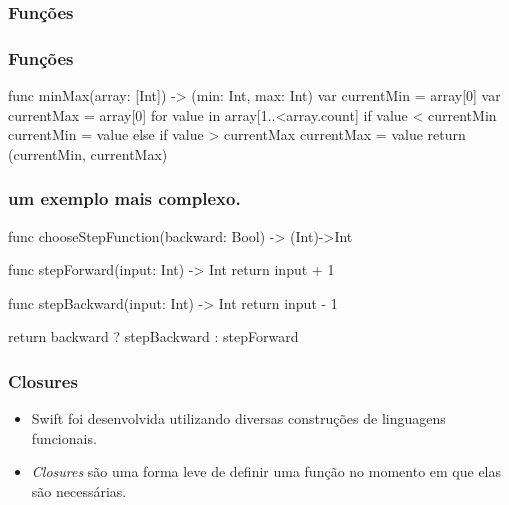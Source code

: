 \begin{frame}[fragile]
    \frametitle{Funções}

\end{frame}

\begin{frame}[fragile]
    \frametitle{Funções}

    \begin{swift}
        func minMax(array: [Int]) -> (min: Int, max: Int) {
            var currentMin = array[0]
            var currentMax = array[0]
            for value in array[1..<array.count] {
                if value < currentMin {
                    currentMin = value
                } else if value > currentMax {
                    currentMax = value
                }
            }
            return (currentMin, currentMax)
        }
    \end{swift}
\end{frame}

\begin{frame}[fragile]
    \frametitle{um exemplo mais complexo.}

    \begin{swift}
        func chooseStepFunction(backward: Bool) -> (Int)->Int
        {
            func stepForward(input: Int) -> Int
            { return input + 1 }

            func stepBackward(input: Int) -> Int
            { return input - 1 }

            return backward ? stepBackward : stepForward
        }
    \end{swift}
\end{frame}

\begin{frame}[fragile]
    \frametitle{Closures}

    \begin{itemize}
        \item Swift foi desenvolvida utilizando diversas construções de
        linguagens funcionais.
        \item \textit{Closures} são uma forma leve de definir uma função
        no momento em que elas são necessárias.
    \end{itemize}
\end{frame}

